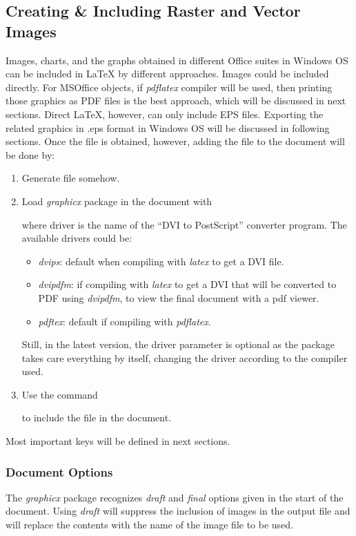 \documentclass[10pt, a4paper]{article}
\begin{document}
\subsection{Creating \& Including Raster and Vector Images}
Images, charts, and the graphs obtained in different Office suites in Windows OS can be included in \LaTeX{} by different approaches. Images could be included directly. For MSOffice objects, if \textsl{pdflatex} compiler will be used, then printing those graphics as PDF files is the best approach, which will be discussed in next sections. Direct \LaTeX{}, however, can only include EPS files. Exporting the related graphics in .eps format in Windows OS will be discussed in following sections. Once the file is obtained, however, adding the file to the document will be done by:
\begin{enumerate}
\item Generate file somehow.
\item Load \emph{graphicx} package in the document with
\begin{center}
\end{center}
where driver is the name of the ``DVI to PostScript'' converter program. The available drivers could be:
\begin{itemize}
\item \emph{dvips}: default when compiling with \emph{latex} to get a DVI file.
\item \emph{dvipdfm}: if compiling with \emph{latex} to get a DVI that will be converted to PDF using \emph{dvipdfm}, to view the final document with a pdf viewer. 
\item \emph{pdftex}: default if compiling with \emph{pdflatex}.
\end{itemize}
Still, in the latest version, the driver parameter is optional as the package takes care everything by itself, changing the driver according to the compiler used. 
\item Use the command 
\begin{center}
\end{center}
to include the file in the document.
\end{enumerate}
Most important keys will be defined in next sections.
\subsubsection{Document Options}
The \emph{graphicx} package recognizes \textsl{draft} and \textsl{final} options given in the start of the document. Using \emph{draft} will suppress the inclusion of images in the output file and will replace the contents with the name of the image file to be used. 
\end{document}
